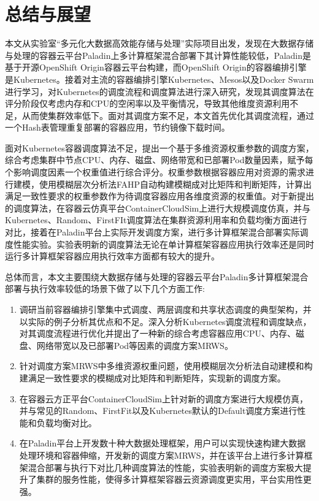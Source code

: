 \chapter{总结与展望}
本文从实验室“多元化大数据高效能存储与处理”实际项目出发，发现在大数据存储与处理的容器云平台Paladin上多计算框架混合部署下其计算性能较低，Paladin是基于开源OpenShift Origin容器云平台构建，而OpenShift Origin的容器编排引擎是Kubernetes。接着对主流的容器编排引擎Kubernetes、Mesos以及Docker Swarm进行学习，对Kubernetes的调度流程和调度算法进行深入研究，发现其调度算法在评分阶段仅考虑内存和CPU的空闲率以及平衡情况，导致其他维度资源利用不足，从而使集群效率低下。面对其调度方案不足，本文首先优化其调度流程，通过一个Hash表管理重复部署的容器应用，节约镜像下载时间。

面对Kubernetes容器调度算法不足，提出一个基于多维资源权重参数的调度方案，综合考虑集群中节点CPU、内存、磁盘、网络带宽和已部署Pod数量因素，赋予每个影响调度因素一个权重值进行综合评分。权重参数根据容器应用对资源的需求进行建模，使用模糊层次分析法FAHP自动构建模糊成对比矩阵和判断矩阵，计算出满足一致性要求的权重参数作为待调度容器应用各维度资源的权重值。对于新提出的调度算法，在容器云仿真平台ContainerCloudSim上进行大规模调度仿真，并与Kubernetes、Random、FirstFIt调度算法在集群资源利用率和负载均衡方面进行对比，接着在Paladin平台上实际开发调度方案，进行多计算框架混合部署实际调度性能实验。实验表明新的调度算法无论在单计算框架容器应用执行效率还是同时运行多计算框架容器应用执行效率方面都有较大的提升。

总体而言，本文主要围绕大数据存储与处理的容器云平台Paladin多计算框架混合部署与执行效率较低的场景下做了以下几个方面工作:
\begin{enumerate}[(1)]
	\item 调研当前容器编排引擎集中式调度、两层调度和共享状态调度的典型架构，并以实际的例子分析其优点和不足。深入分析Kubernetes调度流程和调度缺点，对其调度流程进行优化并提出了一种新的综合考虑容器应用CPU、内存、磁盘、网络带宽以及已部署Pod等因素的调度方案MRWS。
	\item 针对调度方案MRWS中多维资源权重问题，使用模糊层次分析法自动建模和构建满足一致性要求的模糊成对比矩阵和判断矩阵，实现新的调度方案。
	\item 在容器云方正平台ContainerCloudSim上针对新的调度方案进行大规模仿真，并与常见的Random、FirstFit以及Kubernetes默认的Default调度方案进行性能和负载均衡对比。
	\item 在Paladin平台上开发数十种大数据处理框架，用户可以实现快速构建大数据处理环境和容器伸缩，开发新的调度方案MRWS，并在该平台上进行多计算框架混合部署与执行下对比几种调度算法的性能，实验表明新的调度方案极大提升了集群的服务性能，使得多计算框架容器云资源调度更实用，平台实用性更强。
\end{enumerate}

